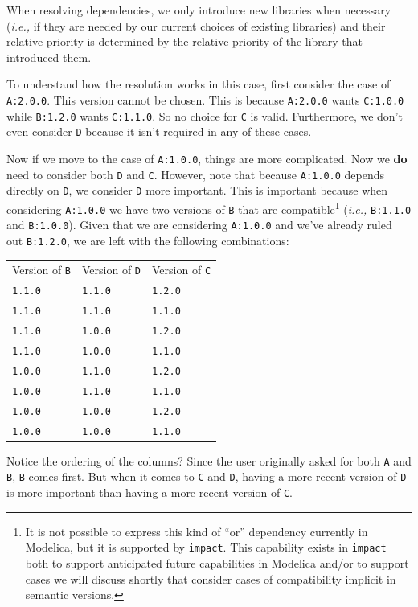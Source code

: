 \documentclass[11pt,a4paper,twocolumn]{article}
\renewcommand{\small}{\fontsize{9.5pt}{11.1pt}\selectfont}
\newcommand{\code}[1]{\texttt{#1}} %
\begin{document}
When resolving dependencies, we only introduce new libraries when
necessary (\emph{i.e.,} if they are needed by our current choices of
existing libraries) and their relative priority is determined by the
relative priority of the library that introduced them.

To understand how the resolution works in this case, first consider
the case of \code{A:2.0.0}.  This version cannot be chosen.  This is
because \code{A:2.0.0} wants \code{C:1.0.0} while \code{B:1.2.0}
wants \code{C:1.1.0}.  So no choice for \code{C} is valid.
Furthermore, we don't even consider \code{D} because it isn't
required in any of these cases.

Now if we move to the case of \code{A:1.0.0}, things are more
complicated.  Now we \textbf{do} need to consider both \code{D} and
\code{C}.  However, note that because \code{A:1.0.0} depends
directly on \code{D}, we consider \code{D} more important.  This is
important because when considering \code{A:1.0.0} we have two
versions of \code{B} that are compatible\footnote{It is not possible
  to express this kind of ``or'' dependency currently in Modelica, but
  it is supported by \code{impact}.  This capability exists in
  \code{impact} both to support anticipated future capabilities in
  Modelica \parencite{impact-MCP} and/or to support cases we will discuss shortly
  that consider cases of compatibility implicit in semantic versions.}
(\emph{i.e.,} \code{B:1.1.0} and \code{B:1.0.0}).  Given that we are
considering \code{A:1.0.0} and we've already ruled out \code{B:1.2.0},
we are left with the following combinations:
{\small
\begin{center}
\begin{tabular}{ l l l }
  Version of \code{B} & Version of \code{D} & Version of \code{C} \\
  \code{1.1.0} & \code{1.1.0} & \code{1.2.0} \\
  \code{1.1.0} & \code{1.1.0} & \code{1.1.0} \\
  \code{1.1.0} & \code{1.0.0} & \code{1.2.0} \\
  \code{1.1.0} & \code{1.0.0} & \code{1.1.0} \\
  \code{1.0.0} & \code{1.1.0} & \code{1.2.0} \\
  \code{1.0.0} & \code{1.1.0} & \code{1.1.0} \\
  \code{1.0.0} & \code{1.0.0} & \code{1.2.0} \\
  \code{1.0.0} & \code{1.0.0} & \code{1.1.0} \\
\end{tabular}
\end{center}
}
Notice the ordering of the columns?  Since the user originally asked
for both \code{A} and \code{B}, \code{B} comes first.  But when it
comes to \code{C} and \code{D}, having a more recent version of
\code{D} is more important than having a more recent version of
\code{C}.
\end{document}
